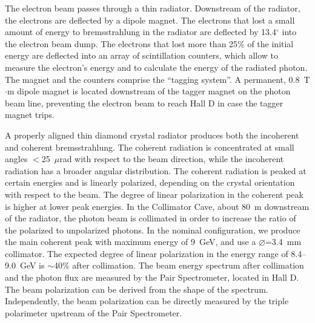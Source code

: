 The electron beam passes through a thin radiator. Downstream of the
radiator, the electrons are deflected by a dipole magnet. The
electrons that lost a small amount of energy to bremsstrahlung in the
radiator are deflected by 13.4$^\circ$ into the electron beam dump.
The electrons that lost more than 25\% of the initial energy are
deflected into an array of scintillation counters, which allow to
measure the electron's energy and to calculate the energy of the
radiated photon. The magnet and the counters comprise the ``tagging
system''. A permanent, 0.8~T$\cdot$m dipole magnet is located
downstream of the tagger magnet on the photon beam line, preventing
the electron beam to reach Hall D in case the tagger magnet trips.

A properly aligned thin diamond crystal radiator produces both the
incoherent and coherent bremsstrahlung. The coherent radiation is
concentrated at small angles $<$25~$\mu$rad with respect to the beam
direction, while the incoherent radiation has a broader angular
distribution.  The coherent radiation is peaked at certain energies
and is linearly polarized, depending on the crystal orientation with
respect to the beam. The degree of linear polarization in the coherent
peak is higher at lower peak energies. In the Collimator Cave, about
80~m downstream of the radiator, the photon beam is collimated in
order to increase the ratio of the polarized to unpolarized photons.  In
the nominal \GX{} configuration, we produce the main coherent peak
with maximum energy of 9~GeV, and use a $\diameter$=3.4~mm collimator.
The expected degree of linear polarization in the energy range of
8.4--9.0~GeV is $\sim$40\% after collimation. The beam energy spectrum
after collimation and the photon flux are measured by the Pair
Spectrometer, located in Hall D. The beam polarization can be derived
from the shape of the spectrum. Independently, the beam polarization
can be directly measured by the triple polarimeter upstream of the
Pair Spectrometer.
 


